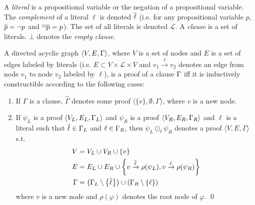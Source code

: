 \documentclass{llncs}
\begin{document}
A \emph{literal} is a propositional variable or the negation of a propositional variable. The
\emph{complement} of a literal $\ell$ is denoted $\overline{\ell}$ (i.e. for any propositional variable $p$,
$\overline{p} = \neg p$ and $\overline{\neg p} = p$). The set of all literals is denoted $\mathcal{L}$. A
\emph{clause} is a set of literals. $\bot$ denotes the \emph{empty clause}.


\newcommand{\axiom}[1]{\widehat{#1}}
\newcommand{\n}{v}
\newcommand{\raiz}[1]{\rho(#1)}

\begin{definition}[Proof] 
\label{def:proof}
A directed acyclic graph $\langle V, E, \Gamma \rangle$, where $V$ is a set of nodes and $E$ is a
set of edges labeled by literals (i.e. $E \subset V \times \mathcal{L} \times V$ and $\n_1
\xrightarrow{\ell} \n_2$ denotes an edge from node $\n_1$ to node $\n_2$ labeled by $\ell$), is a
proof of a clause $\Gamma$ iff it is inductively constructible according to the following cases:
%
\begin{enumerate}
  \item If $\Gamma$ is a clause, $\axiom{\Gamma}$ denotes some proof $\langle \{ \n \}, \emptyset ,
    \Gamma \rangle$, where $\n$ is a new node.
  \item If $\psi_L$ is a proof $\langle V_L, E_L, \Gamma_L \rangle$ and
    $\psi_R$ is a proof $\langle V_R, E_R, \Gamma_R \rangle$ and $\ell$ is a literal such that
    $\overline{\ell} \in \Gamma_L$ and $\ell \in \Gamma_R$, then
    $\psi_L \odot_\ell \psi_R$ denotes a proof $\langle V, E, \Gamma \rangle$ s.t.
    \begin{align*}
      V &= V_L \cup V_R \cup \{\n \} \\
      E &= E_L \cup E_R \cup
                    \left\{ \n \xrightarrow{\dual{\ell}} \raiz{\psi_L}, \n \xrightarrow{\ell} \raiz{\psi_R} \right\} \\
     \Gamma &= \left( \clause_L \setminus \left\{ \dual{\ell} \right\} \right) \cup \left( \clause_R
                    \setminus \left\{ \ell \right\} \right)
    \end{align*}
    where $\n$ is a new node and $\raiz{\varphi}$ denotes the root node of $\varphi$.
  \qed
\end{enumerate}
\end{definition}


\newcommand{\Vertices}[1]{V_{#1}}
\newcommand{\Edges}[1]{E_{#1}}
\newcommand{\Conclusion}[1]{\clause_{#1}}
\newcommand{\Premises}[2]{P_{#1}^{#2}}
\newcommand{\Children}[2]{C_{#1}^{#2}}
\end{document}
